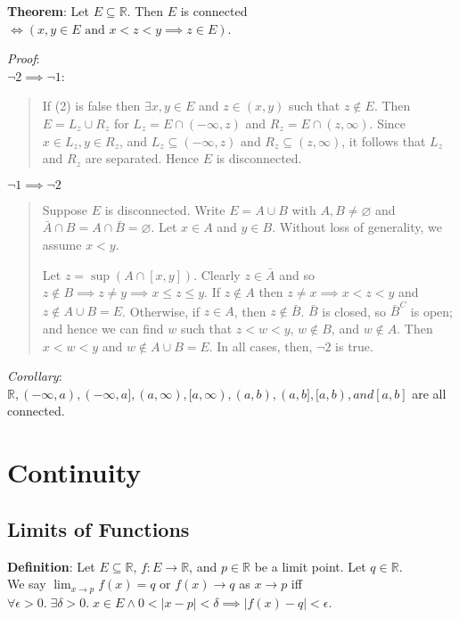 \documentclass[11pt]{article}
\begin{document}
\textbf{Theorem}: Let $E \subseteq \mathbb{R}$. Then $E$ is connected $\iff (x,y \in E \text{ and }x < z < y \implies z \in E)$.

\emph{Proof}:\\
$\neg 2 \implies \neg 1$:
\begin{quote}\vspace{-0.3cm}
If (2) is false then $\exists x,y \in E$ and $z \in (x,y)$ such that $z \notin E$. Then $E = L_z \cup R_z$ for $L_z = E \cap (-\infty, z)$ and $R_z = E \cap (z, \infty)$. Since $x \in L_z, y \in R_z$, and $L_z \subseteq (-\infty, z)$ and $R_z \subseteq (z, \infty)$, it follows that $L_z$ and $R_z$ are separated. Hence $E$ is disconnected.
\end{quote}
$\neg 1 \implies \neg 2$
\begin{quote}\vspace{-0.3cm}
Suppose $E$ is disconnected. Write $E = A \cup B$ with $A, B \neq \varnothing$ and $\bar{A} \cap B = A \cap \bar{B} = \varnothing$. Let $x \in A$ and $y \in B$. Without loss of generality, we assume $x < y$.

Let $z = \sup(A \cap [x,y])$. Clearly $z \in \bar{A}$ and so $z \notin B \implies z \neq y \implies x \leq z \leq y$. If $z \notin A$ then $z \neq x \implies x < z < y$ and $z \notin A \cup B = E$. Otherwise, if $z \in A$, then $z \notin \bar{B}$. $\bar{B}$ is closed, so $\bar{B}^C$ is open; and hence we can find $w$ such that $z < w < y$, $w \notin B$, and $w \notin A$. Then $x < w < y$ and $w \notin A \cup B = E$. In all cases, then, $\neg 2$ is true.
\end{quote}

\emph{Corollary}: $\mathbb{R}, (-\infty, a), (-\infty, a], (a, \infty), [a, \infty), (a,b), (a,b], [a,b), and [a,b]$ are all connected.

\section{Continuity}

\subsection{Limits of Functions}

\textbf{Definition}: Let $E \subseteq \mathbb{R}$, $f : E \to \mathbb{R}$, and $p \in \mathbb{R}$ be a limit point. Let $q \in \mathbb{R}$.\\
We say $\lim_{x \to p} f(x) = q$ or $f(x) \to q$ as $x \to p$ iff $\forall \epsilon > 0.\; \exists \delta > 0.\; x \in E \land 0 < |x-p| < \delta \implies |f(x) - q| < \epsilon$.
\end{document}
